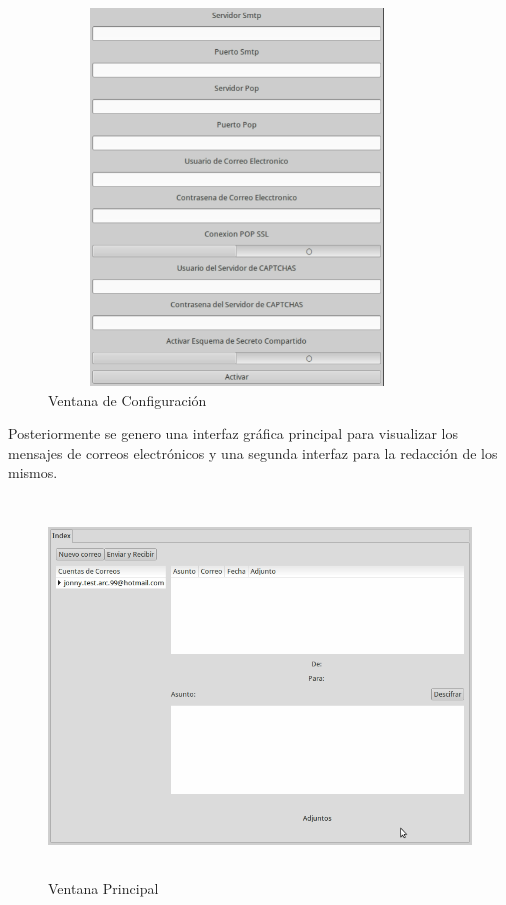 \documentclass[12pt,oneside,onecolumn,openany]{report}
\begin{document}
\begin{figure}[H]
\centering
	\includegraphics[width=10cm, height=10cm]{./images/VentanaConfig.png}
	\caption{Ventana de Configuración}
	\label{fig:6-10-1}
\end{figure}

Posteriormente se genero una interfaz gráfica principal para visualizar los mensajes de correos electrónicos y una segunda interfaz para la redacción de los mismos.

\begin{figure}[H]
\centering
	\includegraphics[width=15cm, height=10cm]{./images/VentanaPrincipal.png}
	\caption{Ventana Principal}
	\label{fig:6-10-2}
\end{figure}
\end{document}
